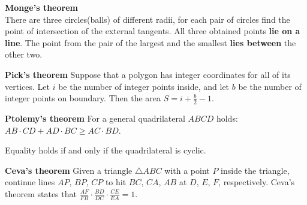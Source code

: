\textbf{Monge's theorem}\\
There are three circles(balls) of different radii, 
for each pair of circles find the point of intersection of the external tangents. 
All three obtained points \textbf{lie on a line}. 
The point from the pair of the largest and the smallest \textbf{lies between} the other two.

\textbf{Pick's theorem}
Suppose that a polygon has integer coordinates for all of its vertices. 
Let $i$ be the number of integer points inside, and let $b$ be the number of integer points on boundary. 
Then the area $S = i + \tfrac{b}{2} - 1$.

\textbf{Ptolemy's theorem}
For a general quadrilateral $ABCD$ holds:
$AB \cdot CD + AD \cdot BC \ge AC \cdot BD$.

Equality holds if and only if the quadrilateral is cyclic.

\textbf{Ceva's theorem}
Given a triangle $\triangle ABC$ with a point $P$ inside the triangle,
continue lines $AP$, $BP$, $CP$ to hit $BC$, $CA$, $AB$ at $D$, $E$, $F$,
respectively.
Ceva's theorem states that
$\frac{AF}{FB} \cdot \frac{BD}{DC} \cdot \frac{CE}{EA} = 1$. 

